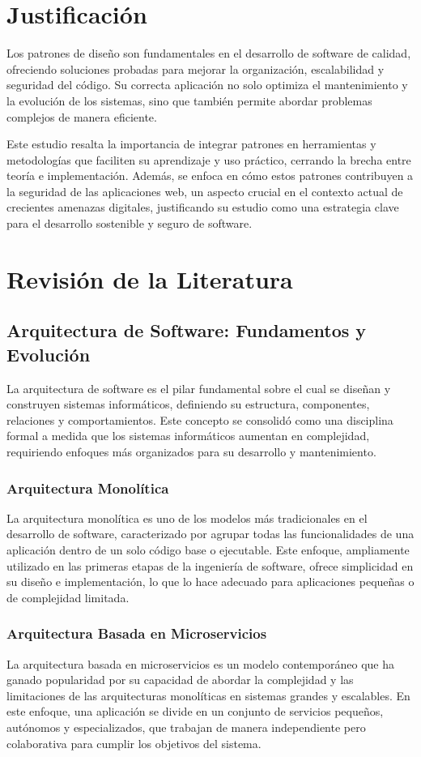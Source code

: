 \documentclass{article}
\begin{document}
\section{Justificación}
Los patrones de diseño son fundamentales en el desarrollo de software de calidad, ofreciendo soluciones probadas para mejorar la organización, escalabilidad y seguridad del código. Su correcta aplicación no solo optimiza el mantenimiento y la evolución de los sistemas, sino que también permite abordar problemas complejos de manera eficiente.

Este estudio resalta la importancia de integrar patrones en herramientas y metodologías que faciliten su aprendizaje y uso práctico, cerrando la brecha entre teoría e implementación. Además, se enfoca en cómo estos patrones contribuyen a la seguridad de las aplicaciones web, un aspecto crucial en el contexto actual de crecientes amenazas digitales, justificando su estudio como una estrategia clave para el desarrollo sostenible y seguro de software.

\section{Revisión de la Literatura}
\subsection{Arquitectura de Software: Fundamentos y Evolución}
La arquitectura de software es el pilar fundamental sobre el cual se diseñan y construyen sistemas informáticos, definiendo su estructura, componentes, relaciones y comportamientos. Este concepto se consolidó como una disciplina formal a medida que los sistemas informáticos aumentan en complejidad, requiriendo enfoques más organizados para su desarrollo y mantenimiento.

\subsubsection{Arquitectura Monolítica}
La arquitectura monolítica es uno de los modelos más tradicionales en el desarrollo de software, caracterizado por agrupar todas las funcionalidades de una aplicación dentro de un solo código base o ejecutable. Este enfoque, ampliamente utilizado en las primeras etapas de la ingeniería de software, ofrece simplicidad en su diseño e implementación, lo que lo hace adecuado para aplicaciones pequeñas o de complejidad limitada.

\subsubsection{Arquitectura Basada en Microservicios}
La arquitectura basada en microservicios es un modelo contemporáneo que ha ganado popularidad por su capacidad de abordar la complejidad y las limitaciones de las arquitecturas monolíticas en sistemas grandes y escalables. En este enfoque, una aplicación se divide en un conjunto de servicios pequeños, autónomos y especializados, que trabajan de manera independiente pero colaborativa para cumplir los objetivos del sistema.
\end{document}
